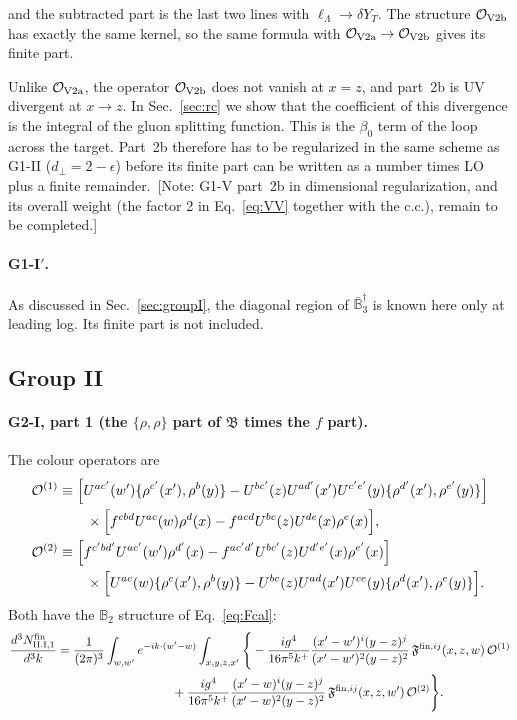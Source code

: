 \documentclass[aps,prd,onecolumn,superscriptaddress,nofootinbib,floatfix,longbibliography,11pt]{revtex4-2}
\numberwithin{equation}{section}
\newif\ifshownotes \shownotestrue
\newcommand{\note}[1]{\ifshownotes{\color{red}\,[\textsf{Note:} #1]}\fi}
\def\mf#1{\mathbb{#1}}
\newcommand{\lL}{\ell_{\Lambda}}
\newcommand{\pre}{\frac{1}{(2\pi)^3}\int_{w,w'}e^{-ik\cdot(w'-w)}}
\newcommand{\Ord}{\mathcal{O}}
\begin{document}
and the subtracted part is the last two lines with $\lL\to\delta Y_T$. The structure $\Ord_{\rm V2b}$ has exactly the same kernel, so the same formula with $\Ord_{\rm V2a}\to\Ord_{\rm V2b}$ gives its finite part.

Unlike $\Ord_{\rm V2a}$, the operator $\Ord_{\rm V2b}$ does not vanish at $x=z$, and part~2b is UV divergent at $x\to z$. In Sec.~\ref{sec:rc} we show that the coefficient of this divergence is the integral of the gluon splitting function. This is the $\beta_0$ term of the loop across the target. Part~2b therefore has to be regularized in the same scheme as G1-II ($d_\perp=2-\epsilon$) before its finite part can be written as a number times LO plus a finite remainder.
\note{G1-V part~2b in dimensional regularization, and its overall weight (the factor 2 in Eq.~\eqref{eq:VV} together with the c.c.), remain to be completed.}

\paragraph*{G1-I$'$.} As discussed in Sec.~\ref{sec:groupI}, the diagonal region of $\bar{\mf B}_3^\dagger$ is known here only at leading log. Its finite part is not included.

\subsection{Group II}\label{sec:finiteG2}

\paragraph*{G2-I, part 1 (the $\{\rho,\rho\}$ part of $\mathfrak B$ times the $f$ part).} The colour operators are
\begin{align}
\Ord^{(1)}&\equiv\Big[U^{ac'}(w')\{\rho^{c'}(x'),\rho^b(y)\}-U^{bc'}(z)U^{ad'}(x')U^{c'e'}(y)\{\rho^{d'}(x'),\rho^{e'}(y)\}\Big]\notag\\
&\qquad\times\Big[f^{cbd}U^{ac}(w)\rho^d(x)-f^{acd}U^{bc}(z)U^{de}(x)\rho^e(x)\Big],\notag\\
\Ord^{(2)}&\equiv\Big[f^{c'bd'}U^{ac'}(w')\rho^{d'}(x)-f^{ac'd'}U^{bc'}(z)U^{d'e'}(x)\rho^{e'}(x)\Big]\notag\\
&\qquad\times\Big[U^{ac}(w)\{\rho^c(x'),\rho^b(y)\}-U^{bc}(z)U^{ad}(x')U^{ce}(y)\{\rho^d(x'),\rho^e(y)\}\Big].
\end{align}
Both have the $\mf B_2$ structure of Eq.~\eqref{eq:Fcal}:
\begin{align}
\frac{d^3N^{\rm fin}_{\rm II.I,1}}{d^3k}={}&\pre\int_{x,y,z,x'}\Bigg\{-\frac{ig^4}{16\pi^5k^+}\frac{(x'-w')^i(y-z)^j}{(x'-w')^2(y-z)^2}\,\mathfrak F^{{\rm fin},ij}(x,z,w)\,\Ord^{(1)}\notag\\
&\hspace{8em}+\frac{ig^4}{16\pi^5k^+}\frac{(x'-w)^i(y-z)^j}{(x'-w)^2(y-z)^2}\,\mathfrak F^{{\rm fin},ij}(x,z,w')\,\Ord^{(2)}\Bigg\}.
\end{align}
\end{document}

